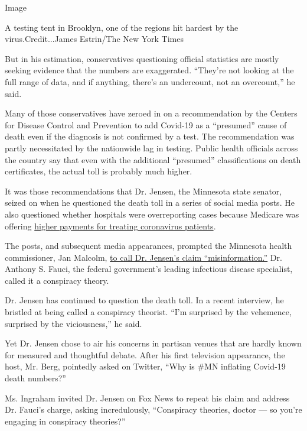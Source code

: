 Image

A testing tent in Brooklyn, one of the regions hit hardest by the
virus.Credit...James Estrin/The New York Times

But in his estimation, conservatives questioning official statistics are
mostly seeking evidence that the numbers are exaggerated. ``They're not
looking at the full range of data, and if anything, there's an
undercount, not an overcount,'' he said.

Many of those conservatives have zeroed in on a recommendation by the
Centers for Disease Control and Prevention to add Covid-19 as a
``presumed'' cause of death even if the diagnosis is not confirmed by a
test. The recommendation was partly necessitated by the nationwide lag
in testing. Public health officials across the country say that even
with the additional ``presumed'' classifications on death certificates,
the actual toll is probably much higher.

It was those recommendations that Dr. Jensen, the Minnesota state
senator, seized on when he questioned the death toll in a series of
social media posts. He also questioned whether hospitals were
overreporting cases because Medicare was offering
\href{https://www.factcheck.org/2020/04/hospital-payments-and-the-covid-19-death-count/}{higher
payments for treating coronavirus patients}.

The posts, and subsequent media appearances, prompted the Minnesota
health commissioner, Jan Malcolm,
\href{https://www.fox9.com/news/minnesota-health-commissioner-criticizes-claims-of-inflated-covid-19-death-counts}{to
call Dr. Jensen's claim ``misinformation.''} Dr. Anthony S. Fauci, the
federal government's leading infectious disease specialist, called it a
conspiracy theory.

Dr. Jensen has continued to question the death toll. In a recent
interview, he bristled at being called a conspiracy theorist. ``I'm
surprised by the vehemence, surprised by the viciousness,'' he said.

Yet Dr. Jensen chose to air his concerns in partisan venues that are
hardly known for measured and thoughtful debate. After his first
television appearance, the host, Mr. Berg, pointedly asked on Twitter,
``Why is \#MN inflating Covid-19 death numbers?''

Ms. Ingraham invited Dr. Jensen on Fox News to repeat his claim and
address Dr. Fauci's charge, asking incredulously, ``Conspiracy theories,
doctor --- so you're engaging in conspiracy theories?''

